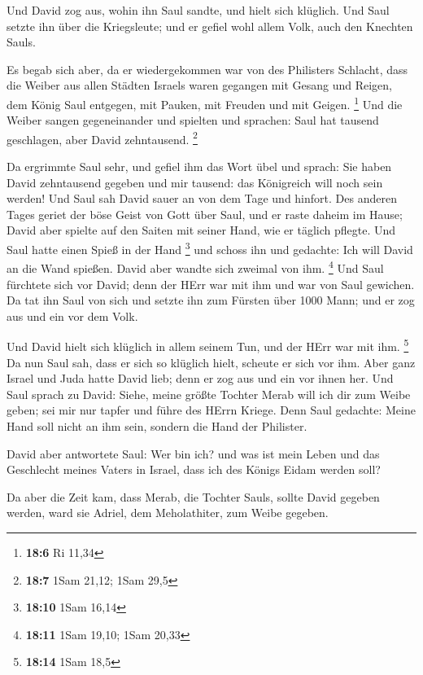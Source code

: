  Und David zog aus, wohin ihn Saul sandte, und hielt sich
klüglich. Und Saul setzte ihn über die Kriegsleute; und er gefiel wohl
allem Volk, auch den Knechten Sauls.

 Es begab sich aber, da er wiedergekommen war von des
Philisters Schlacht, dass die Weiber aus allen Städten Israels waren
gegangen mit Gesang und Reigen, dem König Saul entgegen, mit Pauken, mit
Freuden und mit Geigen. \footnote{\textbf{18:6} Ri 11,34} 
Und die Weiber sangen gegeneinander und spielten und sprachen: Saul hat
tausend geschlagen, aber David zehntausend. \footnote{\textbf{18:7} 1Sam
  21,12; 1Sam 29,5}

 Da ergrimmte Saul sehr, und gefiel ihm das Wort übel und
sprach: Sie haben David zehntausend gegeben und mir tausend: das
Königreich will noch sein werden!  Und Saul sah David sauer
an von dem Tage und hinfort.  Des anderen Tages geriet der
böse Geist von Gott über Saul, und er raste daheim im Hause; David aber
spielte auf den Saiten mit seiner Hand, wie er täglich pflegte. Und Saul
hatte einen Spieß in der Hand \footnote{\textbf{18:10} 1Sam 16,14}
 und schoss ihn und gedachte: Ich will David an die Wand
spießen. David aber wandte sich zweimal von ihm. \footnote{\textbf{18:11}
  1Sam 19,10; 1Sam 20,33}  Und Saul fürchtete sich vor
David; denn der HErr war mit ihm und war von Saul gewichen.
 Da tat ihn Saul von sich und setzte ihn zum Fürsten über
1000 Mann; und er zog aus und ein vor dem Volk.

 Und David hielt sich klüglich in allem seinem Tun, und der
HErr war mit ihm. \footnote{\textbf{18:14} 1Sam 18,5}  Da
nun Saul sah, dass er sich so klüglich hielt, scheute er sich vor ihm.
 Aber ganz Israel und Juda hatte David lieb; denn er zog
aus und ein vor ihnen her.  Und Saul sprach zu David:
Siehe, meine größte Tochter Merab will ich dir zum Weibe geben; sei mir
nur tapfer und führe des HErrn Kriege. Denn Saul gedachte: Meine Hand
soll nicht an ihm sein, sondern die Hand der Philister.

 David aber antwortete Saul: Wer bin ich? und was ist mein
Leben und das Geschlecht meines Vaters in Israel, dass ich des Königs
Eidam werden soll?

 Da aber die Zeit kam, dass Merab, die Tochter Sauls,
sollte David gegeben werden, ward sie Adriel, dem Meholathiter, zum
Weibe gegeben.

